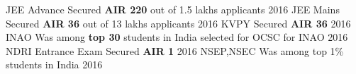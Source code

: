 \begin{cvhonors}
  \cvhonor
    {JEE Advance}
    {Secured \textbf{AIR 220} out of 1.5 lakhs applicants}
    {}
    {2016}
  \cvhonor
    {JEE Mains}
    {Secured \textbf{AIR 36} out of 13 lakhs applicants}
    {}
    {2016}
  \cvhonor
    {KVPY}
    {Secured \textbf{AIR 36}}
    {}
    {2016}
  \cvhonor
    {INAO}
    {Was among \textbf{top 30} students in India selected for OCSC for INAO}
    {}
    {2016}
   \cvhonor
    {NDRI Entrance Exam}
    {Secured \textbf{AIR 1}}
    {}
    {2016}
   \cvhonor
    {NSEP,NSEC}
    {Was among top 1\% students in India}
    {}
    {2016}

\end{cvhonors}


